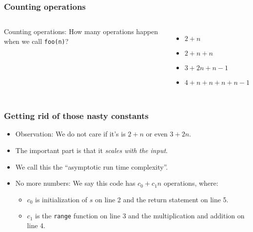 \begin{frame}
	\frametitle{Counting operations}
	\begin{columns}
			
		
Counting operations:			How many operations happen when we call \texttt{foo(n)}?
			\begin{itemize}
				\item $2 + n$
				\item $2 + n + n$
				\item $3 + 2n + n-1$
				\item $4 + n + n + n + n-1$
			\end{itemize}
	\end{columns}
\end{frame}

\begin{frame}
	\frametitle{Getting rid of those nasty constants}

	\begin{itemize}
		\item Observation: We do not care if it's is $2+n$ or even $3+2n$.
		\item The important part is that it \textit{scales with the input}.
			
		\item We call this the ``asymptotic run time complexity''.

		\item No more numbers:		We say this code has $c_0 + c_1n$ operations, where:
		\begin{itemize}
			\item $c_0$ is initialization of $s$ on line 2 and the return statement on line 5.
			\item $c_1$ is the \texttt{range} function on line 3 and the multiplication and addition on line 4.
		\end{itemize}
	\end{itemize}
	
	
	
\end{frame}

